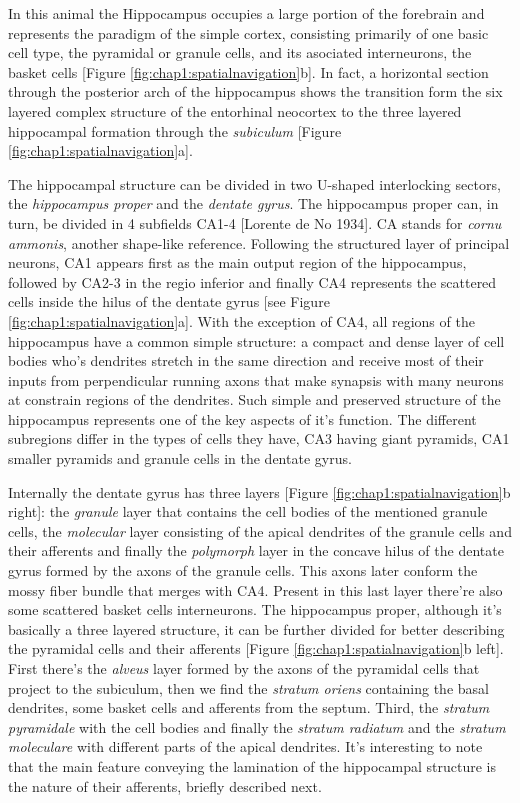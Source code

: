 In this animal the Hippocampus occupies a large portion of the forebrain and represents the paradigm of the simple cortex, consisting primarily of one basic cell type, the pyramidal or granule cells, and its asociated interneurons, the basket cells [Figure \ref{fig:chap1:spatialnavigation}b]. 
In fact, a horizontal section through the posterior arch of the hippocampus shows the transition form the six layered complex structure of the entorhinal neocortex to the three layered hippocampal formation through the \textit{subiculum} [Figure \ref{fig:chap1:spatialnavigation}a].

The hippocampal structure can be divided in two U-shaped interlocking sectors, the \textit{hippocampus proper} and the \textit{dentate gyrus}. 
The hippocampus proper can, in turn, be divided in 4 subfields CA1-4 [Lorente de No 1934]. 
CA stands for \textit{cornu ammonis}, another shape-like reference. 
Following the structured layer of principal neurons, CA1 appears first as the main output region of the hippocampus, followed by CA2-3 in the regio inferior and finally CA4 represents the scattered cells inside the hilus of the dentate gyrus [see Figure \ref{fig:chap1:spatialnavigation}a]. 
With the exception of CA4, all regions of the hippocampus have a common simple structure: a compact and dense layer of cell bodies who's dendrites stretch in the same direction and receive most of their inputs from perpendicular running axons that make synapsis with many neurons at constrain regions of the dendrites. 
Such simple and preserved structure of the hippocampus represents one of the key aspects of it's function. 
The different subregions differ in the types of cells they have, CA3 having giant pyramids, CA1 smaller pyramids and granule cells in the dentate gyrus. 

Internally the dentate gyrus has three layers [Figure \ref{fig:chap1:spatialnavigation}b right]: the \textit{granule} layer that contains the cell bodies of the mentioned granule cells, the \textit{molecular} layer consisting of the apical dendrites of the granule cells and their afferents and finally the \textit{polymorph} layer in the concave hilus of the dentate gyrus formed by the axons of the granule cells.
This axons later conform the mossy fiber bundle that merges with CA4. Present in this last layer there're also some scattered basket cells interneurons.
The hippocampus proper, although it's basically a three layered structure, it can be further divided for better describing the pyramidal cells and their afferents [Figure \ref{fig:chap1:spatialnavigation}b left].
First there's the \textit{alveus} layer formed by the axons of the pyramidal cells that project to the subiculum, then we find the \textit{stratum oriens} containing the basal dendrites, some basket cells and afferents from the septum.
Third, the \textit{stratum pyramidale} with the cell bodies and finally the \textit{stratum radiatum} and the \textit{stratum moleculare} with different parts of the apical dendrites.
It's interesting to note that the main feature conveying the lamination of the hippocampal structure is the nature of their afferents, briefly described next.

